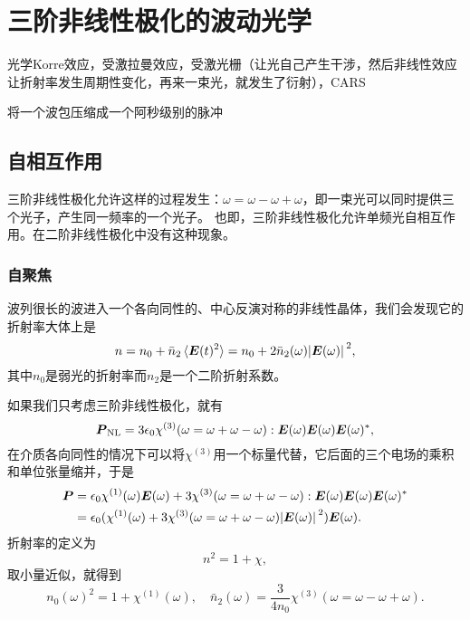 \documentclass[UTF8, a4paper]{ctexart}
\begin{document}
\section{三阶非线性极化的波动光学}

光学Korre效应，受激拉曼效应，受激光栅（让光自己产生干涉，然后非线性效应让折射率发生周期性变化，再来一束光，就发生了衍射），CARS

将一个波包压缩成一个阿秒级别的脉冲

\subsection{自相互作用}

三阶非线性极化允许这样的过程发生：$\omega = \omega - \omega + \omega$，即一束光可以同时提供三个光子，产生同一频率的一个光子。
也即，三阶非线性极化允许单频光自相互作用。在二阶非线性极化中没有这种现象。

\subsubsection{自聚焦}

波列很长的波进入一个各向同性的、中心反演对称的非线性晶体，我们会发现它的折射率大体上是
\begin{equation}
    n = n_0 + \bar{n}_2 \expval*{\vb*{E}(t)^2} = n_0 + 2 \bar{n}_2(\omega) \abs*{\vb*{E}(\omega)}^2,
    \label{eq:ref-index-change}
\end{equation}
其中$n_0$是弱光的折射率而$n_2$是一个二阶折射系数。

如果我们只考虑三阶非线性极化，就有
\[
    \vb*{P}_\text{NL} = 3 \epsilon_0 \chi^{(3)}(\omega=\omega + \omega - \omega) : \vb*{E}(\omega) \vb*{E}(\omega) \vb*{E}(\omega)^*,
\]
在介质各向同性的情况下可以将$\chi^{(3)}$用一个标量代替，它后面的三个电场的乘积和单位张量缩并，于是
\[
    \begin{aligned}
        \vb*{P} &= \epsilon_0 \chi^{(1)}(\omega) \vb*{E}(\omega) +  3 \chi^{(3)}(\omega=\omega + \omega - \omega) : \vb*{E}(\omega) \vb*{E}(\omega) \vb*{E}(\omega)^* \\
        &= \epsilon_0 (\chi^{(1)}(\omega) + 3 \chi^{(3)}(\omega=\omega+\omega-\omega) \abs*{\vb*{E}(\omega)}^2) \vb*{E}(\omega).
    \end{aligned}
\]
折射率的定义为
\[
    n^2 = 1 + \chi,
\]
取小量近似，就得到
\begin{equation}
    n_0(\omega)^2 = 1 + \chi^{(1)}(\omega), \quad \bar{n}_2(\omega) = \frac{3}{4n_0} \chi^{(3)}(\omega=\omega-\omega+\omega).
\end{equation}
\end{document}
